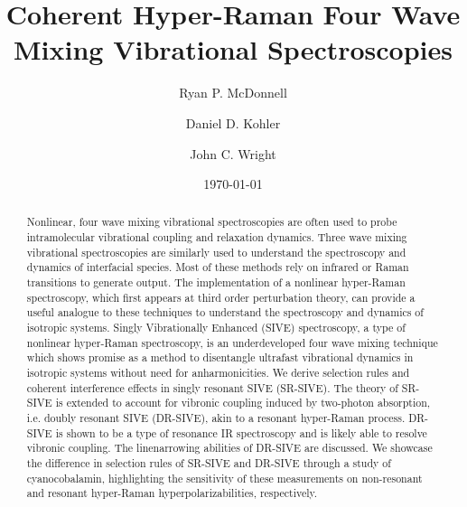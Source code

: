 \documentclass[aip, jcp, draft, onecolumn]{revtex4-2}
\begin{document}
\title{Coherent Hyper-Raman Four Wave Mixing Vibrational Spectroscopies}

\author{Ryan P. McDonnell} 
\author{Daniel D. Kohler}
\author{John C. Wright} 


\date{\today}

\begin{abstract}
Nonlinear, four wave mixing vibrational spectroscopies are often used to probe intramolecular vibrational coupling and relaxation dynamics.
Three wave mixing vibrational spectroscopies are similarly used to understand the spectroscopy and dynamics of interfacial species.
Most of these methods rely on infrared or Raman transitions to generate output. 
The implementation of a nonlinear hyper-Raman spectroscopy, which first appears at third order perturbation theory, can provide a useful analogue to these techniques to understand the spectroscopy and dynamics of isotropic systems.
Singly Vibrationally Enhanced (SIVE) spectroscopy, a type of nonlinear hyper-Raman spectroscopy, is an underdeveloped four wave mixing technique which shows promise as a method to disentangle ultrafast vibrational dynamics in isotropic systems without need for anharmonicities.
We derive selection rules and coherent interference effects in singly resonant SIVE (SR-SIVE).
The theory of SR-SIVE is extended to account for vibronic coupling induced by two-photon absorption, i.e. doubly resonant SIVE (DR-SIVE), akin to a resonant hyper-Raman process. 
DR-SIVE is shown to be a type of resonance IR spectroscopy and is likely able to resolve vibronic coupling.
The linenarrowing abilities of DR-SIVE are discussed.
We showcase the difference in selection rules of SR-SIVE and DR-SIVE through a study of cyanocobalamin, highlighting the sensitivity of these measurements on non-resonant and resonant hyper-Raman hyperpolarizabilities, respectively.
\end{abstract}

\maketitle
\end{document}

